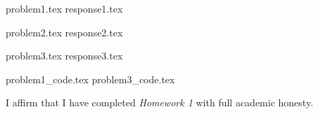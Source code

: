 \documentclass[letterpaper, 12pt]{article}
\begin{document}

{problem1.tex}
{response1.tex}

{problem2.tex}
{response2.tex}

{problem3.tex}
{response3.tex}

\appendix

{problem1_code.tex}
{problem3_code.tex}

\par

I affirm that I have completed \textit{Homework 1} with full academic honesty.
\end{document}
